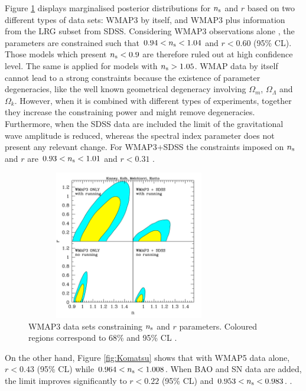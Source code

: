 \documentclass{rmaa}
\begin{document}
Figure \ref{fig:Kinney} displays marginalised posterior distributions for $n_{\rm s}$ and $r$ based on
two different types of data sets: WMAP3 by itself, and WMAP3 plus information from the 
LRG subset from SDSS. Considering WMAP3 observations alone \citep{Kinney}, 
the parameters are constrained such that $0.94 < n_{\rm s} < 1.04$
and $r<0.60$ (95\% CL). Those models which present  $n_{\rm s}<0.9$ are  therefore ruled out at
high confidence level. The same is applied for models with $n_{\rm s} > 1.05$. 
%
WMAP data by itself  cannot lead to a strong constraints because the existence of parameter 
degeneracies, like the well known geometrical degeneracy involving $\Omega_m$, 
$\Omega_{\Lambda}$ and $\Omega_k$. However, when it is combined with different types 
of experiments, together they increase the constraining power and might remove degeneracies. 
Furthermore, when the SDSS data are included the limit of the gravitational wave amplitude 
is reduced, whereas the spectral index parameter does not present any relevant change. 
For WMAP3+SDSS the constraints imposed on $n_{\rm s}$ and $r$ are $0.93<n_{\rm s}<1.01$ and
$r<0.31$ \citep{Kinney}. 

\begin{figure}[h!]
\begin{center}
 \includegraphics[trim = 1mm 10mm -10mm 4mm, clip, width=9cm, height=6.5cm]{rn.pdf}
\caption{ WMAP3 data sets constraining 
$n_{\rm s}$ and $r$ parameters. Coloured regions correspond to 68\% and 95\% CL  \citep{Kinney}.}
\label{fig:Kinney}
\end{center}
\end{figure}

On the other hand, Figure \ref{fig:Komatsu} shows that with WMAP5 data alone,   
$r < 0.43$ (95\% CL) while $0.964< n_{\rm s}<1.008$.
When BAO and SN data are added, the limit improves significantly to 
$r < 0.22$ (95\% CL) and $0.953< n_{\rm s}<0.983$.
 \citep{Komatsu}.
\\
\end{document}
